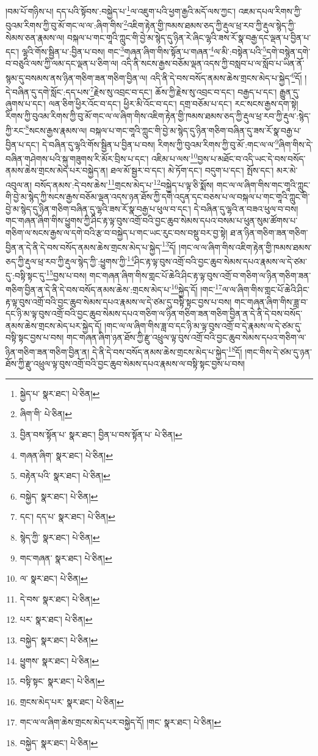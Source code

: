 །བམ་པོ་གཉིས་པ། དད་པའི་སྟོབས་:བསྐྱེད་པ་\footnote{སྐྱེད་པ་  སྣར་ཐང་།  པེ་ཅིན། }ལ་འཇུག་པའི་ཕྱག་རྒྱའི་མདོ་ལས་ཀྱང་། འཇམ་དཔལ་རིགས་ཀྱི་བུའམ་རིགས་ཀྱི་བུ་མོ་གང་ལ་ལ་:ཞིག་གིས་\footnote{ཞིག་གི་  པེ་ཅིན། }འཇིག་རྟེན་གྱི་ཁམས་ཐམས་ཅད་ཀྱི་རྡུལ་ཕྲ་རབ་ཀྱི་རྡུལ་སྙེད་ཀྱི་སེམས་ཅན་རྣམས་ལ། བསྐལ་པ་གང་གཱའི་ཀླུང་གི་བྱེ་མ་སྙེད་དུ་ཉིན་རེ་ཞིང་ལྷའི་ཟས་རོ་སྣ་བརྒྱ་དང་ལྡན་པ་བྱིན་པ་དང་། ལྷའི་གོས་སྦྱིན་པ་:བྱིན་པ་བས། གང་\footnote{བྱིན་བས་སྟོན་པ་  སྣར་ཐང་། བྱིན་པ་བས་སྟོན་པ་  པེ་ཅིན། }གཞན་ཞིག་གིས་སྟོན་པ་གཞན་\footnote{གཞན་ཞིག་  སྣར་ཐང་།  པེ་ཅིན། }ལ་མི་:བསྟེན་པའི་\footnote{བརྟེན་པའི་  སྣར་ཐང་།  པེ་ཅིན། }དགེ་བསྙེན་དགེ་བ་བཅུའི་ལས་ཀྱི་ལམ་དང་ལྡན་པ་ཅིག་ལ། འདི་ནི་སངས་རྒྱས་བཅོམ་ལྡན་འདས་ཀྱི་བསླབ་པ་ལ་སློབ་པ་ཡིན་ནོ་སྙམ་དུ་བསམས་ནས་ཉིན་གཅིག་ཟན་གཅིག་བྱིན་ལ། འདི་ནི་དེ་བས་བསོད་ནམས་ཆེས་གྲངས་མེད་པ་སྐྱེད་\footnote{བསྐྱེད་  སྣར་ཐང་།  པེ་ཅིན། }དོ། །དེ་བཞིན་དུ་དགེ་སློང་:དད་པས་\footnote{དང་། དད་པ་  སྣར་ཐང་།  པེ་ཅིན། }རྗེས་སུ་འབྲང་བ་དང་། ཆོས་ཀྱི་རྗེས་སུ་འབྲང་བ་དང་། བརྒྱད་པ་དང་། རྒྱུན་དུ་ཞུགས་པ་དང་། ལན་ཅིག་ཕྱིར་འོང་བ་དང་། ཕྱིར་མི་འོང་བ་དང་། དགྲ་བཅོམ་པ་དང་། རང་སངས་རྒྱས་དག་སྟེ། རིགས་ཀྱི་བུའམ་རིགས་ཀྱི་བུ་མོ་གང་ལ་ལ་ཞིག་གིས་འཇིག་རྟེན་གྱི་ཁམས་ཐམས་ཅད་ཀྱི་རྡུལ་ཕྲ་རབ་ཀྱི་རྡུལ་:སྙེད་ཀྱི་རང་\footnote{སྙེད་ཀྱི་  སྣར་ཐང་།  པེ་ཅིན། }སངས་རྒྱས་རྣམས་ལ། བསྐལ་པ་གང་གཱའི་ཀླུང་གི་བྱེ་མ་སྙེད་དུ་ཉིན་གཅིག་བཞིན་དུ་ཟས་རོ་སྣ་བརྒྱ་པ་བྱིན་པ་དང་། དེ་བཞིན་དུ་ལྷའི་གོས་སྦྱིན་པ་བྱིན་པ་བས། རིགས་ཀྱི་བུའམ་རིགས་ཀྱི་བུ་མོ་:གང་ལ་ལ་\footnote{གང་གཞན་  སྣར་ཐང་།  པེ་ཅིན། }ཞིག་གིས་དེ་བཞིན་གཤེགས་པའི་སྐུ་གཟུགས་རི་མོར་བྲིས་པ་དང་། འཇིམ་པ་ལས་\footnote{ལ་  སྣར་ཐང་།  པེ་ཅིན། }བྱས་པ་མཐོང་བ་འདི་ཡང་དེ་བས་བསོད་ནམས་ཆེས་གྲངས་མེད་པར་བསྐྱེད་ན། ཐལ་མོ་སྦྱར་བ་དང་། མེ་ཏོག་དང་། བདུག་པ་དང་། སྤོས་དང་། མར་མེ་འབུལ་ན། བསོད་ནམས་:དེ་བས་ཆེས་\footnote{དེ་བས་  སྣར་ཐང་།  པེ་ཅིན། }གྲངས་མེད་པ་\footnote{པར་  སྣར་ཐང་།  པེ་ཅིན། }བསྐྱེད་པ་ལྟ་ཅི་སྨོས། གང་ལ་ལ་ཞིག་གིས་གང་གཱའི་ཀླུང་གི་བྱེ་མ་སྙེད་ཀྱི་སངས་རྒྱས་བཅོམ་ལྡན་འདས་ཉན་ཐོས་ཀྱི་དགེ་འདུན་དང་བཅས་པ་ལ་བསྐལ་པ་གང་གཱའི་ཀླུང་གི་བྱེ་མ་སྙེད་དུ་ཉིན་གཅིག་བཞིན་དུ་ལྷའི་ཟས་རོ་སྣ་བརྒྱ་པ་ཕུལ་བ་དང་། དེ་བཞིན་དུ་ལྷའི་ན་བཟའ་ཕུལ་བ་བས། གང་གཞན་ཞིག་གིས་ཕྱུགས་ཀྱི་ཤིང་རྟ་ལྟ་བུས་འགྲོ་བའི་བྱང་ཆུབ་སེམས་དཔའ་བསམ་པ་ཕུན་སུམ་ཚོགས་པ་གཅིག་ལ་སངས་རྒྱས་ལ་དགེ་བའི་རྩ་བ་བསྐྱེད་པ་གང་ཡང་རུང་བས་བསྡུ་བར་བྱ་སྟེ། ཐ་ན་ཉིན་གཅིག་ཟན་གཅིག་བྱིན་ན་དེ་ནི་དེ་བས་བསོད་ནམས་ཆེས་གྲངས་མེད་པ་སྐྱེད་\footnote{བསྐྱེད་  སྣར་ཐང་།  པེ་ཅིན། }དོ། །གང་ལ་ལ་ཞིག་གིས་འཇིག་རྟེན་གྱི་ཁམས་ཐམས་ཅད་ཀྱི་རྡུལ་ཕྲ་རབ་ཀྱི་རྡུལ་སྙེད་ཀྱི་:ཕྱུགས་ཀྱི་\footnote{ཕྱུགས་  སྣར་ཐང་།  པེ་ཅིན། }ཤིང་རྟ་ལྟ་བུས་འགྲོ་བའི་བྱང་ཆུབ་སེམས་དཔའ་རྣམས་ལ་དེ་ཙམ་དུ་:བསྟི་སྟང་དུ་\footnote{བསྟི་སྟང་  སྣར་ཐང་།  པེ་ཅིན། }བྱས་པ་བས། གང་གཞན་ཞིག་གིས་གླང་པོ་ཆེའི་ཤིང་རྟ་ལྟ་བུས་འགྲོ་བ་གཅིག་ལ་ཉིན་གཅིག་ཟན་གཅིག་བྱིན་ན་དེ་ནི་དེ་བས་བསོད་ནམས་ཆེས་:གྲངས་མེད་པ་\footnote{གྲངས་མེད་པར་  སྣར་ཐང་།  པེ་ཅིན། }སྐྱེད་དོ། །གང་\footnote{གང་ལ་ལ་ཞིག་ཆེས་གྲངས་མེད་པར་བསྐྱེད་དོ། །གང་  སྣར་ཐང་།  པེ་ཅིན། }ལ་ལ་ཞིག་གིས་གླང་པོ་ཆེའི་ཤིང་རྟ་ལྟ་བུས་འགྲོ་བའི་བྱང་ཆུབ་སེམས་དཔའ་རྣམས་ལ་དེ་ཙམ་དུ་བསྟི་སྟང་བྱས་པ་བས། གང་གཞན་ཞིག་གིས་ཟླ་བ་དང་ཉི་མ་ལྟ་བུས་འགྲོ་བའི་བྱང་ཆུབ་སེམས་དཔའ་གཅིག་ལ་ཉིན་གཅིག་ཟན་གཅིག་བྱིན་ན་དེ་ནི་དེ་བས་བསོད་ནམས་ཆེས་གྲངས་མེད་པར་སྐྱེད་དོ། །གང་ལ་ལ་ཞིག་གིས་ཟླ་བ་དང་ཉི་མ་ལྟ་བུས་འགྲོ་བ་དེ་རྣམས་ལ་དེ་ཙམ་དུ་བསྟི་སྟང་བྱས་པ་བས། གང་གཞན་ཞིག་ཉན་ཐོས་ཀྱི་རྫུ་འཕྲུལ་ལྟ་བུས་འགྲོ་བའི་བྱང་ཆུབ་སེམས་དཔའ་གཅིག་ལ་ཉིན་གཅིག་ཟན་གཅིག་བྱིན་ན། དེ་ནི་དེ་བས་བསོད་ནམས་ཆེས་གྲངས་མེད་པ་སྐྱེད་\footnote{བསྐྱེད་  སྣར་ཐང་།  པེ་ཅིན། }དོ། །གང་གིས་དེ་ཙམ་དུ་ཉན་ཐོས་ཀྱི་རྫུ་འཕྲུལ་ལྟ་བུས་འགྲོ་བའི་བྱང་ཆུབ་སེམས་དཔའ་རྣམས་ལ་བསྟི་སྟང་བྱས་པ་བས། 